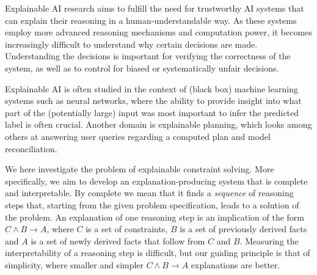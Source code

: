 

Explainable AI research aims to fulfill the need for trustworthy AI systems that can explain their reasoning in a human-understandable way. 
As these systems employ more advanced reasoning mechanisms and computation power, it becomes increasingly difficult to understand why certain decisions are made. 
Understanding the decisions is important for verifying the correctness of the system, as well as to control for biased or systematically unfair decisions.

Explainable AI is often studied in the context of (black box) machine learning systems such as neural networks, where the ability to provide insight into what part of the (potentially large) input was most important to infer the predicted label is often crucial. 
Another domain is explainable planning, which looks among others at answering user queries regarding a computed plan and model reconciliation.

We here investigate the problem of explainable constraint solving. More specifically, we aim to develop an explanation-producing system that is complete and interpretable. By complete we mean that it finds a \textit{sequence} of reasoning steps that, starting from the given problem specification, leads to a solution of the problem. An explanation of one reasoning step is an implication of the form $C \wedge B \rightarrow A$, where $C$ is a set of constraints, $B$ is a set of previously derived facts and $A$ is a set of newly derived facts that follow from $C$ and $B$. Measuring the interpretability of a reasoning step is difficult, but our guiding principle is that of simplicity, where smaller and simpler $C \wedge B \rightarrow A$ explanations are better. 

